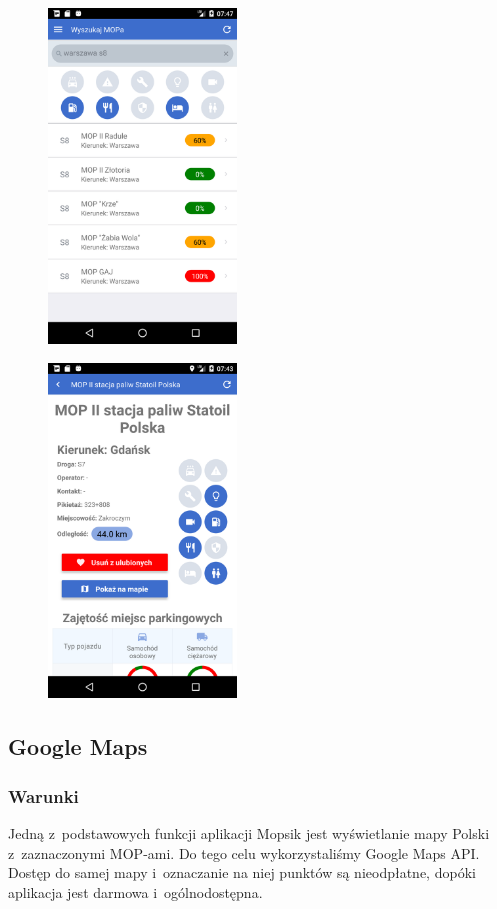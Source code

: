 \begin{figure}[!htb]
\centering
\begin{minipage}{.5\textwidth}
  \centering
  \includegraphics[width=5cm]{images/mopsik_mobile/search.png}
  \label{mopsik_search}
\end{minipage}%
\begin{minipage}{.5\textwidth}
  \centering
  \includegraphics[width=5cm]{images/mopsik_mobile/details.png}
  \label{mopsik_details}
\end{minipage}
\end{figure}


\subsection{Google Maps}
\subsubsection{Warunki}
Jedną z~podstawowych funkcji aplikacji Mopsik jest wyświetlanie mapy Polski z~zaznaczonymi MOP-ami. Do tego celu wykorzystaliśmy Google Maps API. Dostęp do samej mapy i~oznaczanie na niej punktów są nieodpłatne, dopóki aplikacja jest darmowa i~ogólnodostępna\cite{google-api-faq}.
